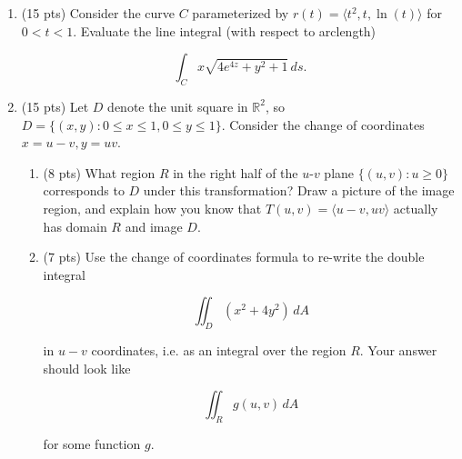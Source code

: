 \documentclass[12 pt]{report}
\begin{document}
\begin{enumerate}
%
%
%
%
%
%
%
%
%
%
%
%
%
%

\newpage

\item (15 pts) Consider the curve $C$ parameterized by $r(t) = \langle t^2, t, \ln(t) \rangle$ for $0 < t < 1$. Evaluate the line integral (with respect to arclength)

\[
\int_C x \sqrt{4e^{4z} + y^2 + 1} \, ds.
\]

\newpage

\item (15 pts) Let $D$ denote the unit square in $\mathbb{R}^2$, so $D = \{(x,y): 0 \leq x \leq 1, 0 \leq y \leq 1\}$. Consider the change of coordinates $x = u - v, y = uv$. 

\begin{enumerate} \item (8 pts) What region $R$ in the right half of the $u$-$v$ plane $\{(u,v): u \geq 0\}$ corresponds to $D$ under this transformation? Draw a picture of the image region, and explain how you know that $T(u,v) = \langle u - v, uv \rangle$ actually has domain $R$ and image $D$. 

\vspace{10cm}

\item (7 pts) Use the change of coordinates formula to re-write the double integral 

\[ 
\iint_D (x^2 + 4y^2) \, dA
\]

in $u-v$ coordinates, i.e. as an integral over the region $R$. Your answer should look like 

\[ 
\iint_R g(u,v) \, dA
\]

for some function $g$.  

\vfill

\end{enumerate}

\end{enumerate}
\end{document}
